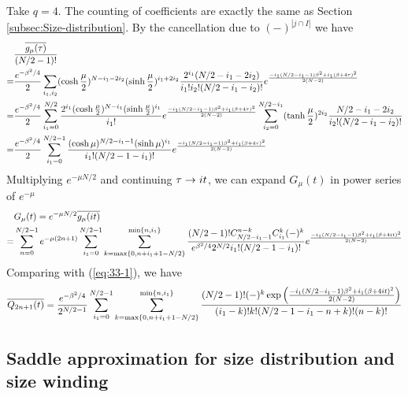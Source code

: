 \documentclass[11pt]{article}
\renewcommand{\>}{\rangle}
\newcommand{\<}{\langle}
\begin{document}
Take $q=4$. The counting of coefficients are exactly the same as
Section \ref{subsec:Size-distribution}. By the cancellation due to
$(-)^{|j\cap I|}$ we have
\begin{align}
 & \frac{\overline{g_{\mu}(\tau)}}{(N/2-1)!}\nonumber \\
= & \frac{e^{-\beta^{2}/4}}{2}\sum_{i_{1},i_{2}}(\cosh\frac{\mu}{2})^{N-i_{1}-2i_{2}}(\sinh\frac{\mu}{2})^{i_{1}+2i_{2}}\frac{2^{i_{1}}(N/2-i_{1}-2i_{2})}{i_{1}!i_{2}!(N/2-i_{1}-i_{2})!}e^{\frac{-i_{1}(N/2-i_{1}-1)\beta^{2}+i_{1}(\beta+4\tau)^{2}}{2(N-2)}}\nonumber \\
= & \frac{e^{-\beta^{2}/4}}{2}\sum_{i_{1}=0}^{N/2}\frac{2^{i_{1}}(\cosh\frac{\mu}{2})^{N-i_{1}}(\sinh\frac{\mu}{2})^{i_{1}}}{i_{1}!}e^{\frac{-i_{1}(N/2-i_{1}-1)\beta^{2}+i_{1}(\beta+4\tau)^{2}}{2(N-2)}}\sum_{i_{2}=0}^{N/2-i_{1}}(\tanh\frac{\mu}{2})^{2i_{2}}\frac{N/2-i_{1}-2i_{2}}{i_{2}!(N/2-i_{1}-i_{2})!}\nonumber \\
= & \frac{e^{-\beta^{2}/4}}{2}\sum_{i_{1}=0}^{N/2-1}\frac{(\cosh\mu)^{N/2-i_{1}-1}(\sinh\mu)^{i_{1}}}{i_{1}!(N/2-1-i_{1})!}e^{\frac{-i_{1}(N/2-i_{1}-1)\beta^{2}+i_{1}(\beta+4\tau)^{2}}{2(N-2)}}\label{eq:43}
\end{align}
Multiplying $e^{-\mu N/2}$ and continuing $\tau\rightarrow it$, we can expand
$G_{\mu}(t)$ in power series of $e^{-\mu}$
\begin{align}
 & G_{\mu}(t)=e^{-\mu N/2}\overline{g_{\mu}(it)}\nonumber \\
= & \sum_{n=0}^{N/2-1}e^{-\mu(2n+1)}\sum_{i_{1}=0}^{N/2-1}\sum_{k=\max\{0,n+i_{1}+1-N/2\}}^{\min\{n,i_{1}\}}\frac{(N/2-1)!C_{N/2-i_{1}-1}^{n-k}C_{i_{1}}^{k}(-)^{k}}{e^{\beta^{2}/4}2^{N/2}i_{1}!(N/2-1-i_{1})!}e^{\frac{-i_{1}(N/2-i_{1}-1)\beta^{2}+i_{1}(\beta+4it)^{2}}{2(N-2)}}
\end{align}
Comparing with (\ref{eq:33-1}), we have
\begin{equation}
\overline{Q_{2n+1}(t)}=\frac{e^{-\beta^{2}/4}}{2^{N/2-1}}\sum_{i_{1}=0}^{N/2-1}\sum_{k=\max\{0,n+i_{1}+1-N/2\}}^{\min\{n,i_{1}\}}\frac{(N/2-1)!(-)^{k}\exp\left(\frac{-i_{1}(N/2-i_{1}-1)\beta^{2}+i_{1}(\beta+4it)^{2}}{2(N-2)}\right)}{(i_{1}-k)!k!(N/2-1-i_{1}-n+k)!(n-k)!}\label{eq:45}
\end{equation}


\subsection{Saddle approximation for size distribution and size winding\label{subsec:Saddle-approximation-for}}
\end{document}

